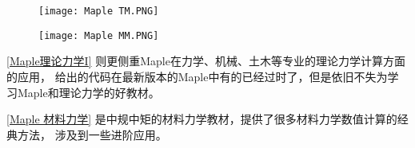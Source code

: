 \begin{large}
\begin{spacing}{1.5}
        \begin{figure}[htbp]
            \centering
            \begin{minipage}[t]
                {0.45\textwidth}
                \centering
                \texttt{[image: Maple TM.PNG]}
                \caption{\textcite[Maple 理论力学 I]{李银山2013maple}}

                \label{Maple理论力学I}
            \end{minipage}
            \quad
            \begin{minipage}[t]
                {0.45\textwidth}
                \centering
                \texttt{[image: Maple MM.PNG]}
                \caption{\textcite[Maple 材料力学]{李银山2013maple2}}
                \label{Maple 材料力学}
            \end{minipage}

        \end{figure}
        \autoref{Maple理论力学I} \textcite[Maple 理论力学 I]{李银山2013maple} 则更侧重Maple在力学、机械、土木等专业的理论力学计算方面的应用，
        给出的代码在最新版本的Maple中有的已经过时了，但是依旧不失为学
        习Maple和理论力学的好教材。

        \autoref{Maple 材料力学} \textcite[Maple 材料力学]{李银山2013maple2} 是中规中矩的材料力学教材，提供了很多材料力学数值计算的经典方法，
        涉及到一些进阶应用。
    \end{spacing}
\end{large}


\restoregeometry